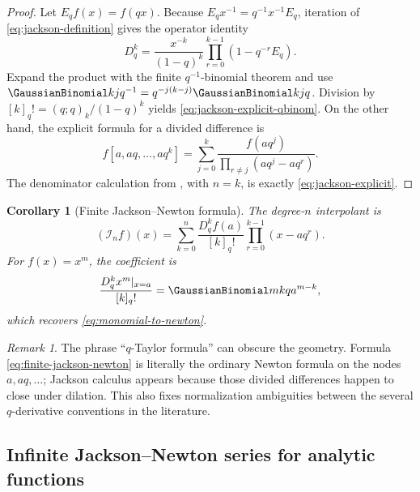 \documentclass[11pt,a4paper,oneside]{article}
\newtheorem{corollary}[corollary]{Corollary}
\theoremstyle{definition}
\theoremstyle{remark}
\newtheorem{remark}[remark]{Remark}
\newcommand{\Iop}{\mathcal I}
\begin{document}
\begin{proof}
Let $E_qf(x)=f(qx)$.  Because $E_qx^{-1}=q^{-1}x^{-1}E_q$,
iteration of \eqref{eq:jackson-definition} gives the operator identity
\begin{equation}
 D_q^k
 =\frac{x^{-k}}{(1-q)^k}
 \prod_{r=0}^{k-1}(1-q^{-r}E_q).
 \label{eq:jackson-operator-product}
\end{equation}
Expand the product with the finite $q^{-1}$-binomial theorem and use
\(
 \GaussianBinomial kj{q^{-1}}=q^{-j(k-j)}\GaussianBinomial kjq
\).  Division by
$[k]_q!=(q;q)_k/(1-q)^k$ yields
\eqref{eq:jackson-explicit-qbinom}.  On the other hand, the explicit formula
for a divided difference is
\[
 f[a,aq,\ldots,aq^k]
 =\sum_{j=0}^k
 \frac{f(aq^j)}{\prod_{r\ne j}(aq^j-aq^r)}.
\]
The denominator calculation from , with $n=k$, is
exactly \eqref{eq:jackson-explicit}.
\end{proof}

\begin{corollary}[Finite Jackson--Newton formula]
\label{cor:finite-jackson-newton}
The degree-$n$ interpolant is
\begin{equation}
 (\Iop_nf)(x)
 =\sum_{k=0}^n\frac{D_q^kf(a)}{[k]_q!}
   \prod_{r=0}^{k-1}(x-aq^r).
 \label{eq:finite-jackson-newton}
\end{equation}
For $f(x)=x^m$, the coefficient is
\begin{equation}
 \frac{D_q^kx^m|_{x=a}}{[k]_q!}
 =\GaussianBinomial mkq a^{m-k},
 \label{eq:monomial-jackson}
\end{equation}
which recovers \eqref{eq:monomial-to-newton}.
\end{corollary}

\begin{remark}
The phrase ``$q$-Taylor formula'' can obscure the geometry.  Formula
\eqref{eq:finite-jackson-newton} is literally the ordinary Newton formula on
the nodes $a,aq,\ldots$; Jackson calculus appears because those divided
differences happen to close under dilation.  This also fixes normalization
ambiguities between the several $q$-derivative conventions in the literature.
\end{remark}

\subsection{Infinite Jackson--Newton series for analytic functions}
\end{document}
